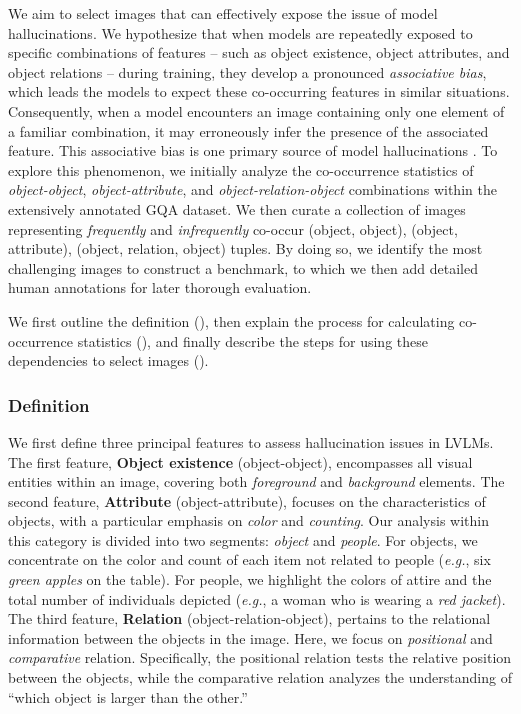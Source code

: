 We aim to select images that can effectively expose the issue of model hallucinations. We hypothesize that when models are repeatedly exposed to specific combinations of features -- such as object existence, object attributes, and object relations -- during training, they develop a pronounced \textit{associative bias}, which leads the models to expect these co-occurring features in similar situations. Consequently, when a model encounters an image containing only one element of a familiar combination, it may erroneously infer the presence of the associated feature. This associative bias is one primary source of model hallucinations \cite{li-etal-2023-evaluating,zhou2023analyzing}. To explore this phenomenon, we initially analyze the co-occurrence statistics of \textit{object-object}, \textit{object-attribute}, and \textit{object-relation-object} combinations within the extensively annotated GQA \cite{Hudson2019GQAAN} dataset. We then curate a collection of images representing \textit{frequently} and \textit{infrequently} co-occur (object, object), (object, attribute), (object, relation, object) tuples. By doing so, we identify the most challenging images to construct a benchmark, to which we then add detailed human annotations for later thorough evaluation. 

We first outline the definition (), then explain the process for calculating co-occurrence statistics (), and finally describe the steps for using these dependencies to select images ().

\vspace{-1mm}
\subsubsection{Definition}
\label{sec:definition}

We first define three principal features to assess hallucination issues in LVLMs. The first feature, \textbf{Object existence} (object-object), encompasses all visual entities within an image, covering both \textit{foreground} and \textit{background} elements. The second feature, \textbf{Attribute} (object-attribute), focuses on the characteristics of objects, with a particular emphasis on \textit{color} and \textit{counting}. Our analysis within this category is divided into two segments: \textit{object} and \textit{people}. For objects, we concentrate on the color and count of each item not related to people (\textit{e.g.}, six \textit{green apples} on the table). For people, we highlight the colors of attire and the total number of individuals depicted (\textit{e.g.}, a woman who is wearing a \textit{red jacket}). The third feature, \textbf{Relation} (object-relation-object), pertains to the relational information between the objects in the image. Here, we focus on \textit{positional} and \textit{comparative} relation. Specifically, the positional relation tests the relative position between the objects, while the comparative relation analyzes the understanding of ``which object is larger than the other.'' 

